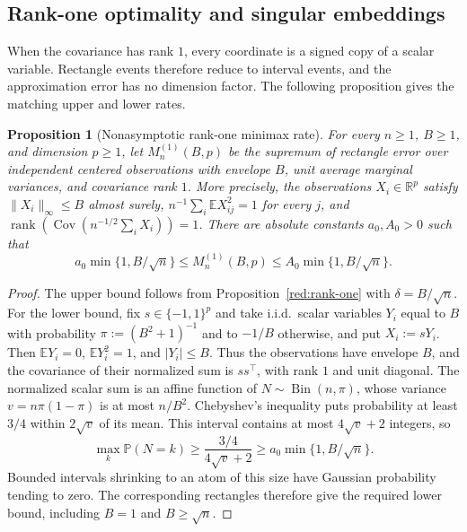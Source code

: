 \documentclass[11pt,a4paper]{article}
\newtheorem{proposition}{Proposition}
\theoremstyle{remark}
\newcommand{\E}{\mathbb E}
\newcommand{\Pp}{\mathbb P}
\newcommand{\R}{\mathbb R}
\newcommand{\Cov}{\operatorname{Cov}}
\begin{document}
\subsection{Rank-one optimality and singular embeddings}
\label{opt:rank-and-singularity}

When the covariance has rank \(1\), every coordinate is a signed
copy of a scalar variable. Rectangle events therefore reduce to
interval events, and the approximation error has no dimension factor.
The following proposition gives the matching upper and lower rates.

\begin{proposition}[Nonasymptotic rank-one minimax rate]
\label{opt:rank-one-minimax}
For every \(n\ge1\), \(B\ge1\), and dimension \(p\ge1\), let
\(M_n^{(1)}(B,p)\) be the supremum of rectangle error over independent
centered observations with envelope \(B\), unit average marginal
variances, and covariance rank \(1\). More precisely, the observations
\(X_i\in\R^p\) satisfy \(\|X_i\|_\infty\le B\) almost surely,
\(n^{-1}\sum_i\E X_{ij}^2=1\) for every \(j\), and
\(\operatorname{rank}(\Cov(n^{-1/2}\sum_iX_i))=1\).
There are absolute constants
\(a_0,A_0>0\) such that
\begin{equation}
 a_0\min\{1,B/\sqrt n\}
 \le M_n^{(1)}(B,p)
 \le A_0\min\{1,B/\sqrt n\}.
 \label{opt:rank-one-minimax-rate}
\end{equation}
\end{proposition}

\begin{proof}
The upper bound follows from Proposition~\ref{red:rank-one} with
\(\delta=B/\sqrt n\). For the lower bound, fix
\(s\in\{-1,1\}^p\) and take i.i.d.\ scalar variables \(Y_i\) equal to
\(B\) with probability \(\pi:=(B^2+1)^{-1}\) and to
\(-1/B\) otherwise, and put \(X_i:= sY_i\). Then
\(\E Y_i=0\), \(\E Y_i^2=1\), and \(|Y_i|\le B\).
Thus the observations have envelope \(B\), and the covariance of
their normalized sum is \(ss^\top\), with rank \(1\) and unit diagonal.
The normalized scalar sum is an affine function of
\(N\sim\operatorname{Bin}(n,\pi)\), whose variance
\(v=n\pi(1-\pi)\) is at most \(n/B^2\).
Chebyshev's inequality puts probability at least \(3/4\) within
\(2\sqrt v\) of its mean. This interval contains at most
\(4\sqrt v+2\) integers, so
\[
 \max_k\Pp(N=k)\ge\frac{3/4}{4\sqrt v+2}
 \ge a_0\min\{1,B/\sqrt n\}.
\]
Bounded intervals shrinking to an atom of this size have Gaussian
probability tending to zero. The corresponding rectangles therefore
give the required lower bound, including \(B=1\) and
\(B\ge\sqrt n\).
\end{proof}
\end{document}
